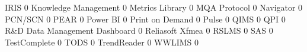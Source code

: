 \documentclass{article}
\begin{document}
\begin{Schunk}
\begin{Soutput}
  IRIS                                                                           0
  Knowledge Management                                                           0
  Metrics Library                                                                0
  MQA Protocol                                                                   0
  Navigator                                                                      0
  PCN/SCN                                                                        0
  PEAR                                                                           0
  Power BI                                                                       0
  Print on Demand                                                                0
  Pulse                                                                          0
  QIMS                                                                           0
  QPI                                                                            0
  R&D Data Management Dashboard                                                  0
  Reliasoft Xfmea                                                                0
  RSLMS                                                                          0
  SAS                                                                            0
  TestComplete                                                                   0
  TODS                                                                           0
  TrendReader                                                                    0
  WWLIMS                                                                         0
                                                           

\end{Soutput}
\end{Schunk}
\end{document}
